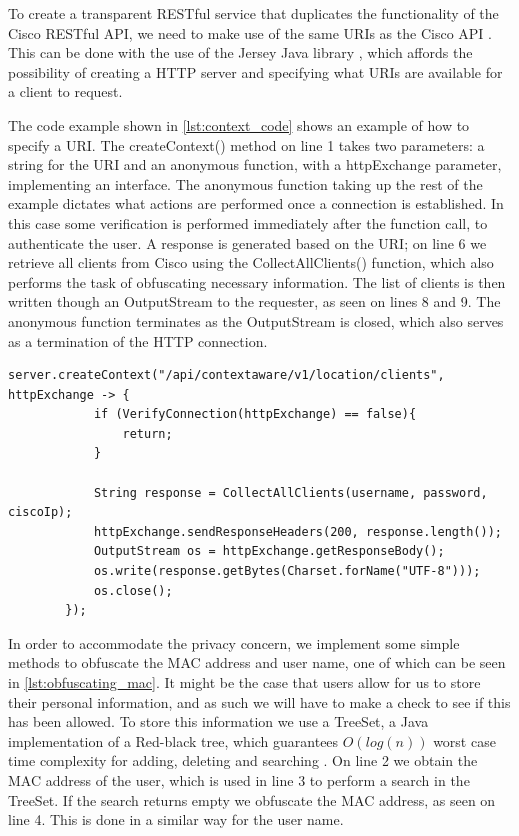 To create a transparent RESTful service that duplicates the functionality of the Cisco RESTful API, we need to make use of the same URIs as the Cisco API \cite{cisco_mse_api}. This can be done with the use of the Jersey Java library \cite{restful_in_java}, which affords the possibility of creating a HTTP server and specifying what URIs are available for a client to request.

The code example shown in \cref{lst:context_code} shows an example of how to specify a URI. The createContext() method on line 1 takes two parameters: a string for the URI and an anonymous function, with a httpExchange parameter, implementing an interface. The anonymous function taking up the rest of the example dictates what actions are performed once a connection is established. In this case some verification is performed immediately after the function call, to authenticate the user. A response is generated based on the URI; on line 6 we retrieve all clients from Cisco using the CollectAllClients() function, which also performs the task of obfuscating necessary information. The list of clients is then written though an OutputStream to the requester, as seen on lines 8 and 9. The anonymous function terminates as the OutputStream is closed, which also serves as a termination of the HTTP connection. 

\begin{lstlisting}[caption={Adding a URI},label={lst:context_code},language=inc_Java]
server.createContext("/api/contextaware/v1/location/clients", httpExchange -> {
            if (VerifyConnection(httpExchange) == false){
                return;
            }

            String response = CollectAllClients(username, password, ciscoIp);
            httpExchange.sendResponseHeaders(200, response.length());
            OutputStream os = httpExchange.getResponseBody();
            os.write(response.getBytes(Charset.forName("UTF-8")));
            os.close();
        });
\end{lstlisting}

In order to accommodate the privacy concern, we implement some simple methods to obfuscate the MAC address and user name, one of which can be seen in \cref{lst:obfuscating_mac}. It might be the case that users allow for us to store their personal information, and as such we will have to make a check to see if this has been allowed. To store this information we use a TreeSet, a Java implementation of a Red-black tree, which guarantees $O(log(n))$ worst case time complexity for adding, deleting and searching \cite{aa_book}\cite{treeset}. On line 2 we obtain the MAC address of the user, which is used in line 3 to perform a search in the TreeSet. If the search returns empty we obfuscate the MAC address, as seen on line 4. This is done in a similar way for the user name.

